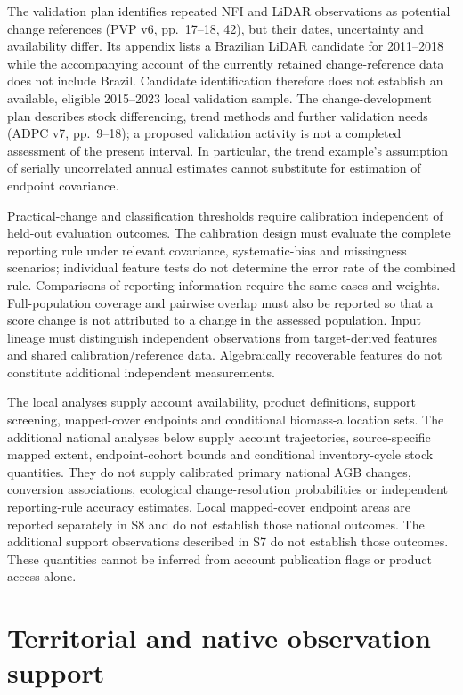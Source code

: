 \documentclass[11pt,a4paper]{article}
\begin{document}
The validation plan identifies repeated NFI and LiDAR observations as potential change references (PVP v6, pp.~17--18, 42), but their dates, uncertainty and availability differ. Its appendix lists a Brazilian LiDAR candidate for 2011--2018 while the accompanying account of the currently retained change-reference data does not include Brazil. Candidate identification therefore does not establish an available, eligible 2015--2023 local validation sample. The change-development plan describes stock differencing, trend methods and further validation needs (ADPC v7, pp.~9--18); a proposed validation activity is not a completed assessment of the present interval. In particular, the trend example's assumption of serially uncorrelated annual estimates cannot substitute for estimation of endpoint covariance.

Practical-change and classification thresholds require calibration independent of held-out evaluation outcomes. The calibration design must evaluate the complete reporting rule under relevant covariance, systematic-bias and missingness scenarios; individual feature tests do not determine the error rate of the combined rule. Comparisons of reporting information require the same cases and weights. Full-population coverage and pairwise overlap must also be reported so that a score change is not attributed to a change in the assessed population. Input lineage must distinguish independent observations from target-derived features and shared calibration/reference data. Algebraically recoverable features do not constitute additional independent measurements.

The local analyses supply account availability, product definitions, support screening, mapped-cover endpoints and conditional biomass-allocation sets. The additional national analyses below supply account trajectories, source-specific mapped extent, endpoint-cohort bounds and conditional inventory-cycle stock quantities. They do not supply calibrated primary national AGB changes, conversion associations, ecological change-resolution probabilities or independent reporting-rule accuracy estimates. Local mapped-cover endpoint areas are reported separately in S8 and do not establish those national outcomes. The additional support observations described in S7 do not establish those outcomes. These quantities cannot be inferred from account publication flags or product access alone.

\section{Territorial and native observation support}
\end{document}
